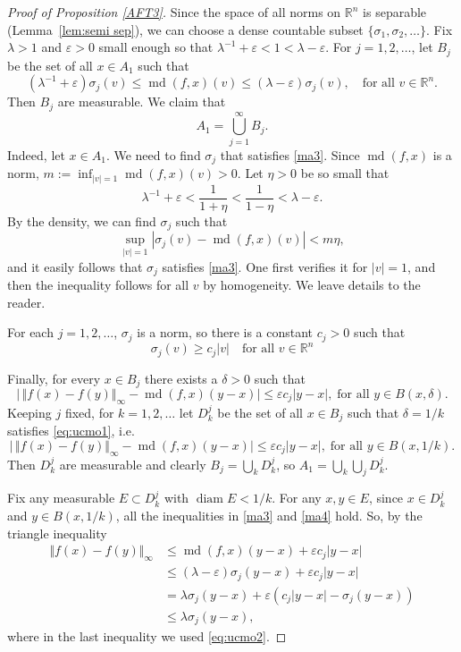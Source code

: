 \documentclass[12pt,leqno]{amsart}
\theoremstyle{definition}
\newcommand{\bbbr}{\mathbb R}
\newcommand{\eps}{\varepsilon}
\def\diam{\operatorname{diam}}
\def\md{\operatorname{md}}
\numberwithin{theorem}{section} \numberwithin{equation}{section}
\begin{document}
\begin{proof}[Proof of Proposition \ref{AFT3}]
Since the space of all norms on $\bbbr^n$ is separable (Lemma~\ref{lem:semi sep}),  we can choose a dense countable subset $\{\sigma_1,\sigma_2,\ldots\}$.
Fix $\lambda>1$ and $\eps > 0$ small enough so that $\lambda^{-1}+\eps < 1 < \lambda - \eps$. For $j=1,2,\ldots$, let $B_j$ be the set of all $x \in A_1$ such that
\begin{equation}
\label{ma3}
(\lambda^{-1}+\eps)  \sigma_j(v) \leq \md(f,x)(v) \leq (\lambda - \eps) \sigma_j(v), \quad \text{for all $v \in \bbbr^n$.}
\end{equation}
Then $B_j$ are measurable. We claim that
$$
A_1 = \bigcup_{j=1}^\infty B_j.
$$
Indeed, let $x\in A_1$. We need to find $\sigma_j$ that satisfies \eqref{ma3}. Since $\md(f,x)$ is a norm, $m:=\inf_{|v|=1}\md(f,x)(v)>0$. Let $\eta>0$ be so small that
$$
\lambda^{-1}+\eps<\frac{1}{1+\eta}<\frac{1}{1-\eta}<\lambda-\eps.
$$
By the density, we can find $\sigma_j$ such that
$$
\sup_{|v|=1}|\sigma_j(v)-\md(f,x)(v)|<m\eta,
$$
and it easily follows that $\sigma_j$ satisfies \eqref{ma3}. One first verifies it for $|v|=1$, and then the inequality follows for all $v$ by homogeneity. We leave details to the reader.

For each $j=1,2,\ldots$, $\sigma_j$ is a norm, so there is a constant $c_j >0$ such that
\begin{equation}\label{eq:ucmo2}
     \sigma_j(v) \ge c_j |v| \quad \text{for all $v \in \bbbr^n$}
\end{equation}

Finally, for every $x \in B_j$ there exists a $\delta >0$ such that
\begin{equation}\label{eq:ucmo1}
\big|\, \Vert f(x)-f(y)\Vert_\infty - \md(f,x)(y-x)\big| \leq \eps c_j|y-x|, \; \text{for all $y \in B(x,\delta)$.}
\end{equation}
Keeping $j$ fixed, for $k=1,2,\ldots$ let $ D^j_k $ be the set of all $x \in B_j$ such that $\delta=1/k$ satisfies \eqref{eq:ucmo1}, i.e.\
\begin{equation}
    \label{ma4}
    \big|\, \Vert f(x)-f(y)\Vert_\infty - \md(f,x)(y-x)\big| \leq \eps c_j|y-x|, \; \text{for all $y \in B(x,{1}/{k})$.}
\end{equation}
Then $D^j_k$ are measurable and clearly $B_j = \bigcup_k D^j_k$, so $A_1 =\bigcup_k\bigcup_j D^j_k$.

Fix any measurable $E\subset D^j_k$ with $\diam E < 1/k$. For any $x,y \in E$, since $x \in D^j_k$ and $y \in B(x,{1}/{k})$, all the inequalities in \eqref{ma3} and \eqref{ma4} hold. So, by the triangle inequality
\begin{align*}
    \Vert f(x)-f(y)\Vert_\infty &\leq \md(f,x)(y-x)+\eps c_j|y-x| \\
    &\le (\lambda-\eps)\sigma_j(y-x)+\eps c_j|y-x|\\
    &= \lambda \sigma_j(y-x) +\eps (c_j|y-x|-\sigma_j(y-x))\\
    &\le \lambda \sigma_j(y-x),
\end{align*}
where in the last inequality we used \eqref{eq:ucmo2}.


\end{proof}
\end{document}
